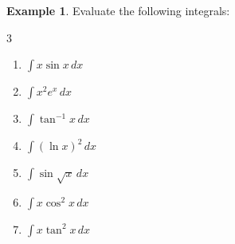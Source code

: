 \documentclass{book}
\theoremstyle{definition}
\newtheorem{example}{Example}[section]
\begin{document}
\begin{example}
Evaluate the following integrals:
\begin{multicols}{3}

\begin{enumerate}[label=(\roman*)]
    \item $\displaystyle\int x\sin x\,dx$
    \item $\displaystyle\int x^2 e^x\,dx$
    \item $\displaystyle\int \tan^{-1}x\,dx$
    \item $\displaystyle\int (\ln x)^2\,dx$
    \item $\displaystyle\int \sin \sqrt{x}\,dx$
    \item $\displaystyle\int x\cos^2 x\,dx$
    \item $\displaystyle\int x\tan^2 x\,dx$
\end{enumerate}
\end{multicols}    
\end{example}
\end{document}
